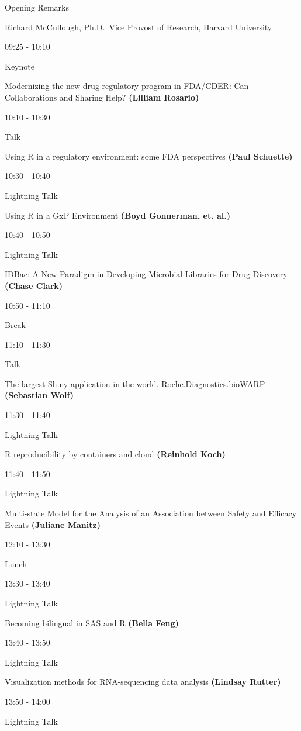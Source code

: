 \documentclass[]{book}
\theoremstyle{definition}
\theoremstyle{definition}
\theoremstyle{definition}
\theoremstyle{remark}
\begin{document}
Opening Remarks

Richard McCullough, Ph.D.~Vice Provost of Research, Harvard University

09:25 - 10:10

Keynote

Modernizing the new drug regulatory program in FDA/CDER: Can
Collaborations and Sharing Help? \textbf{(Lilliam Rosario)}

10:10 - 10:30

Talk

Using R in a regulatory environment: some FDA perspectives \textbf{(Paul
Schuette)}

10:30 - 10:40

Lightning Talk

Using R in a GxP Environment \textbf{(Boyd Gonnerman, et. al.)}

10:40 - 10:50

Lightning Talk

IDBac: A New Paradigm in Developing Microbial Libraries for Drug
Discovery \textbf{(Chase Clark)}

10:50 - 11:10

Break

11:10 - 11:30

Talk

The largest Shiny application in the world. Roche.Diagnostics.bioWARP
\textbf{(Sebastian Wolf)}

11:30 - 11:40

Lightning Talk

R reproducibility by containers and cloud \textbf{(Reinhold Koch)}

11:40 - 11:50

Lightning Talk

Multi-state Model for the Analysis of an Association between Safety and
Efficacy Events \textbf{(Juliane Manitz)}

12:10 - 13:30

Lunch

13:30 - 13:40

Lightning Talk

Becoming bilingual in SAS and R \textbf{(Bella Feng)}

13:40 - 13:50

Lightning Talk

Visualization methods for RNA-sequencing data analysis \textbf{(Lindsay
Rutter)}

13:50 - 14:00

Lightning Talk
\end{document}
